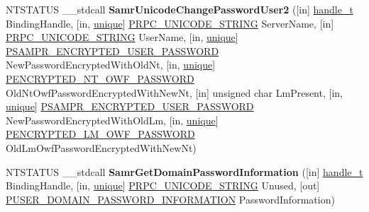 \begin{DoxyCompactItemize}
\item 
\mbox{\label{interfacesamr_ad498a1a160ce1c3e620d4aaf1bf3efe2}} 
N\+T\+S\+T\+A\+T\+US \+\_\+\+\_\+stdcall {\bfseries Samr\+Unicode\+Change\+Password\+User2} (\mbox{[}in\mbox{]} \hyperlink{interfacevoid}{handle\+\_\+t} Binding\+Handle, \mbox{[}in, \hyperlink{interfaceunique}{unique}\mbox{]} \hyperlink{struct___r_p_c___u_n_i_c_o_d_e___s_t_r_i_n_g}{P\+R\+P\+C\+\_\+\+U\+N\+I\+C\+O\+D\+E\+\_\+\+S\+T\+R\+I\+NG} Server\+Name, \mbox{[}in\mbox{]} \hyperlink{struct___r_p_c___u_n_i_c_o_d_e___s_t_r_i_n_g}{P\+R\+P\+C\+\_\+\+U\+N\+I\+C\+O\+D\+E\+\_\+\+S\+T\+R\+I\+NG} User\+Name, \mbox{[}in, \hyperlink{interfaceunique}{unique}\mbox{]} \hyperlink{struct___s_a_m_p_r___e_n_c_r_y_p_t_e_d___u_s_e_r___p_a_s_s_w_o_r_d}{P\+S\+A\+M\+P\+R\+\_\+\+E\+N\+C\+R\+Y\+P\+T\+E\+D\+\_\+\+U\+S\+E\+R\+\_\+\+P\+A\+S\+S\+W\+O\+RD} New\+Password\+Encrypted\+With\+Old\+Nt, \mbox{[}in, \hyperlink{interfaceunique}{unique}\mbox{]} \hyperlink{struct___e_n_c_r_y_p_t_e_d___l_m___o_w_f___p_a_s_s_w_o_r_d}{P\+E\+N\+C\+R\+Y\+P\+T\+E\+D\+\_\+\+N\+T\+\_\+\+O\+W\+F\+\_\+\+P\+A\+S\+S\+W\+O\+RD} Old\+Nt\+Owf\+Password\+Encrypted\+With\+New\+Nt, \mbox{[}in\mbox{]} unsigned char Lm\+Present, \mbox{[}in, \hyperlink{interfaceunique}{unique}\mbox{]} \hyperlink{struct___s_a_m_p_r___e_n_c_r_y_p_t_e_d___u_s_e_r___p_a_s_s_w_o_r_d}{P\+S\+A\+M\+P\+R\+\_\+\+E\+N\+C\+R\+Y\+P\+T\+E\+D\+\_\+\+U\+S\+E\+R\+\_\+\+P\+A\+S\+S\+W\+O\+RD} New\+Password\+Encrypted\+With\+Old\+Lm, \mbox{[}in, \hyperlink{interfaceunique}{unique}\mbox{]} \hyperlink{struct___e_n_c_r_y_p_t_e_d___l_m___o_w_f___p_a_s_s_w_o_r_d}{P\+E\+N\+C\+R\+Y\+P\+T\+E\+D\+\_\+\+L\+M\+\_\+\+O\+W\+F\+\_\+\+P\+A\+S\+S\+W\+O\+RD} Old\+Lm\+Owf\+Password\+Encrypted\+With\+New\+Nt)
\item 
\mbox{\label{interfacesamr_afe7c54b6a0c74cfe1d28c9d5ae22fcb6}} 
N\+T\+S\+T\+A\+T\+US \+\_\+\+\_\+stdcall {\bfseries Samr\+Get\+Domain\+Password\+Information} (\mbox{[}in\mbox{]} \hyperlink{interfacevoid}{handle\+\_\+t} Binding\+Handle, \mbox{[}in, \hyperlink{interfaceunique}{unique}\mbox{]} \hyperlink{struct___r_p_c___u_n_i_c_o_d_e___s_t_r_i_n_g}{P\+R\+P\+C\+\_\+\+U\+N\+I\+C\+O\+D\+E\+\_\+\+S\+T\+R\+I\+NG} Unused, \mbox{[}out\mbox{]} \hyperlink{struct___u_s_e_r___d_o_m_a_i_n___p_a_s_s_w_o_r_d___i_n_f_o_r_m_a_t_i_o_n}{P\+U\+S\+E\+R\+\_\+\+D\+O\+M\+A\+I\+N\+\_\+\+P\+A\+S\+S\+W\+O\+R\+D\+\_\+\+I\+N\+F\+O\+R\+M\+A\+T\+I\+ON} Password\+Information)
\item 

\end{DoxyCompactItemize}
